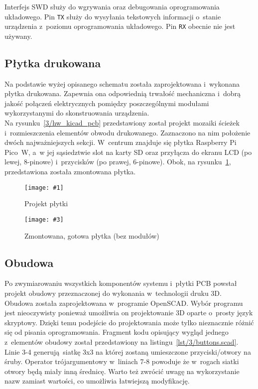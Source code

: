 \documentclass[polish]{aghengthesis}
\newcommand{\imgintss}[5]{
	\begin{figure}[{#5}]
		\centering
		\begin{minipage}{.45\textwidth}
			\centering
			\texttt{[image: \#1]}
			\caption{#2}
			\label{#1}
		\end{minipage}%
		\hfill
		\begin{minipage}{.45\textwidth}
			\centering
			\texttt{[image: \#3]}
			\caption{#4}
			\label{#3}
		\end{minipage}
	\end{figure}
}
\newcommand{\imghss}[4]{\imgintss{#1}{#2}{#3}{#4}{H}}
\begin{document}
				Interfejs SWD służy do wgrywania oraz debugowania oprogramowania układowego.
				Pin \lstinline|TX| służy do wysyłania tekstowych informacji o~stanie urządzenia z~poziomu oprogramowania układowego.
				Pin \lstinline|RX| obecnie nie jest używany.
				
		\subsection{Płytka drukowana}
			Na podstawie wyżej opisanego schematu została zaprojektowana i~wykonana płytka drukowana.
			Zapewnia ona odpowiednią trwałość mechaniczna i~dobrą jakość połączeń elektrycznych pomiędzy poszczególnymi modułami wykorzystanymi do skonstruowania urządzenia.
			$ $\\

			Na rysunku~\ref{3/hw_kicad_pcb} przedstawiony został projekt mozaiki ścieżek i~rozmieszczenia elementów obwodu drukowanego. Zaznaczono na nim położenie dwóch najważniejszych sekcji. W~centrum znajduje się płytka Raspberry Pi Pico~W, a~w jej sąsiedztwie slot na karty SD oraz przyłącza do ekranu LCD (po lewej, 8-pinowe) i~przycisków (po prawej, 6-pinowe). Obok, na rysunku~\ref{3/hw_pcb}, przedstawiona została zmontowana płytka.
			
			\imghss{3/hw_kicad_pcb}{Projekt płytki}{3/hw_pcb}{Zmontowana, gotowa płytka (bez modułów)}
			
		\subsection{Obudowa}
			Po zwymiarowaniu wszystkich komponentów systemu i~płytki PCB powstał projekt obudowy przeznaczonej do wykonania w~technologii druku 3D.
			$ $\\
			
			Obudowa została zaprojektowana w~programie OpenSCAD\textsuperscript{\cite{hw_openscad}}. Wybór programu jest nieoczywisty ponieważ umożliwia on projektowanie 3D oparte o~prosty język skryptowy. Dzięki temu podejście do projektowania może tylko nieznacznie różnić się od pisania oprogramowania. Fragment kodu opisujący wygląd jednego z~elementów obudowy został przedstawiony na listingu~\ref{lst/3/buttons.scad}. Linie 3-4 generują siatkę 3x3 na której zostaną umieszczone przyciski/otwory na śruby. Operator trójargumentowy w~liniach 7-8 powoduje że w~rogach siatki otwory będą miały inną średnicę. Warto też zwrócić uwagę na wykorzystanie nazw zamiast wartości, co umożliwia łatwiejszą modyfikację.
			
\end{document}
